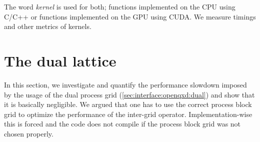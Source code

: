 The word \emph{kernel} is used for both; functions implemented on the CPU using C/C++ or functions implemented on the GPU using CUDA.
We measure timings and other metrics of kernels.

\section{The dual lattice}
\label{sec:perf:dual}

In this section, we investigate and quantify the performance slowdown imposed by the usage of the dual process grid (\cref{sec:interface:openqxd:dual}) and show that it is basically negligible.
We argued that one has to use the correct process block grid to optimize the performance of the inter-grid operator.
Implementation-wise this is forced and the code does not compile if the process block grid was not chosen properly.

